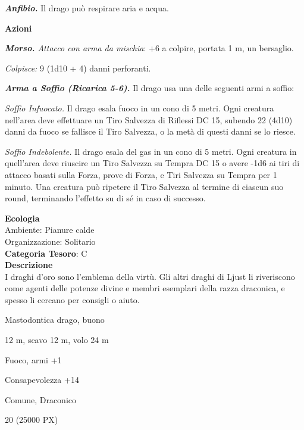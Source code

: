 \begin{multicols}{2}
{\emph{\textbf{Anfibio.}} Il drago può respirare aria e acqua.

\textbf{Azioni}

\emph{\textbf{Morso.} Attacco con arma da mischia}: +6 a colpire, portata 1 m, un bersaglio.

\emph{Colpisce:} 9 (1d10 + 4) danni perforanti.

\emph{\textbf{Arma a Soffio (Ricarica 5-6).}} Il drago usa una delle seguenti armi a soffio:

\emph{Soffio Infuocato.} Il drago esala fuoco in un cono di 5 metri. Ogni creatura nell'area deve effettuare un Tiro Salvezza di Riflessi DC 15, subendo 22 (4d10) danni da fuoco se fallisce il Tiro Salvezza, o la metà di questi danni se lo riesce.

\emph{Soffio Indebolente.} Il drago esala del gas in un cono di 5 metri. Ogni creatura in quell'area deve riuscire un Tiro Salvezza su Tempra DC 15 o avere -1d6 ai tiri di attacco basati sulla Forza, prove di Forza, e Tiri Salvezza su Tempra per 1 minuto. Una creatura può ripetere il Tiro Salvezza al termine di ciascun suo round, terminando l'effetto su di sé in caso di successo.

\textbf{Ecologia}\\
Ambiente: Pianure calde\\
Organizzazione: Solitario\\
\textbf{Categoria Tesoro}: C\\
\textbf{Descrizione}\\
I draghi d'oro sono l'emblema della virtù. Gli altri draghi di Ljust li riveriscono come agenti delle potenze divine e membri esemplari della razza draconica, e spesso li cercano per consigli o aiuto.

\begin{description}[noitemsep, topsep=0pt, parsep=0pt, partopsep=0pt, itemsep=1pt, leftmargin=2.35cm,  labelwidth=2.2cm, itemindent=0cm, listparindent=0pt] %
\setlength{\baselineskip}{10pt}
\item[\textbf{Taglia/Tipo}] Mastodontica drago, buono
\item[\textbf{Caratt.}] 
\item[\textbf{Punti Ferita}] 
\item[\textbf{Movimento}] 12 m, scavo 12 m, volo 24 m
\item[\textbf{Tiri Salvez.}] 
\item[\textbf{Imm. Danni}] Fuoco, armi +1
\item[\textbf{Comp.}] Consapevolezza +14
\item[\textbf{Sensi}] 
\item[\textbf{Linguaggi}] Comune, Draconico
\item[\textbf{Sfida}] 20 (25000 PX)
\end{description}
\smallskip

}
\end{multicols}
